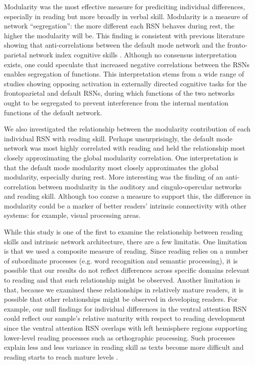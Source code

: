\begin{itmeize}
Modularity was the most effective measure for prediciting individual differences, especially in reading but more broadly in verbal skill. Modularity is a measure of network ``segregation'': the more different each RSN behaves during rest, the higher the modularity will be. This finding is consistent with previous literature showing that anti-correlations between the default mode network and the fronto-parietal network index cognitive skills \citep{Anticevic2012}. Although no consensus interpretation exists, one could speculate that increased negative correlations between the RSNs enables segregation of functions. This interpretation stems from a wide range of studies showing opposing activation in externally directed cognitive tasks for the frontoparietal and default RSNs, during which functions of the two networks ought to be segregated to prevent interference from the internal mentation functions of the default network. 

We also investigated the relationship between the modularity contribution of each individual RSN with reading skill. Perhaps unsurprisingly, the default mode network was most highly correlated with reading and held the relationship most closely approximating the global modularity correlation. One interpretation is that the default mode modularity most closely approximates the global modularity, especially during rest. More interesting was the finding of an anti-correlation between modularity in the auditory and cingulo-opercular networks and reading skill. Although too coarse a measure to support this, the difference in modularity could be a marker of better readers' intrinsic connectivity with other systems: for example, visual processing areas.  


While this study is one of the first to examine the relationship between reading skills and intrinsic network architecture, there are a few limitatis. One limitation is that we used a composite measure of reading. Since reading relies on a number of subordinate processes (e.g. word recognition and semantic processing), it is possible that our results do not reflect differences across specific domains relevant to reading and that such relationship might be observed. Another limitation is that, because we examined these relationships in relatively mature readers, it is possible that other relationships might be observed in developing readers. For example, our null findings for individual differences in the ventral attention RSN could reflect our sample’s relative maturity with respect to reading development since the ventral attention RSN overlaps with left hemisphere regions supporting lower-level reading processes such as orthographic processing. Such processes explain less and less variance in reading skill as texts become more difficult and reading starts to reach mature levels \citep{Cutting2006}. 


\end{itmeize}
